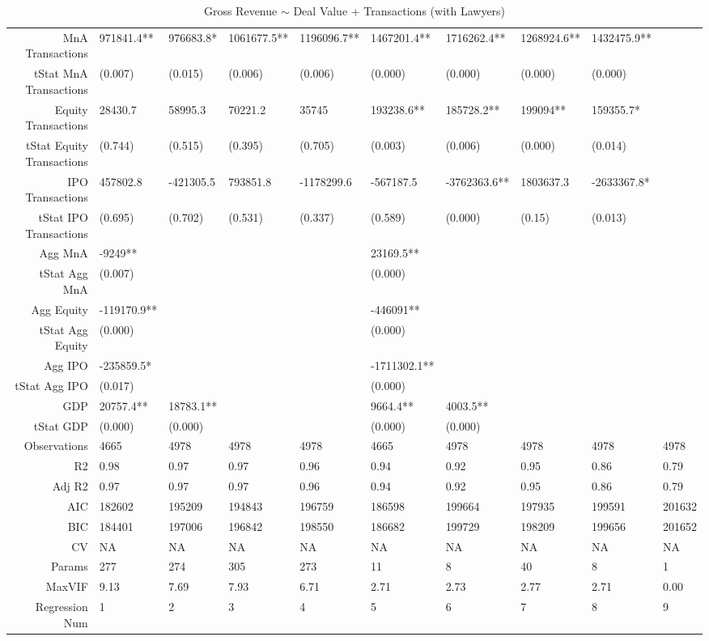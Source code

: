 \begin{table}[ht]
\begin{tabular}{rlllllllll}
  MnA Transactions & 971841.4** & 976683.8* & 1061677.5** & 1196096.7** & 1467201.4** & 1716262.4** & 1268924.6** & 1432475.9** &  \\ 
  tStat MnA Transactions & (0.007) & (0.015) & (0.006) & (0.006) & (0.000) & (0.000) & (0.000) & (0.000) &  \\ 
  Equity Transactions & 28430.7 & 58995.3 & 70221.2 & 35745 & 193238.6** & 185728.2** & 199094** & 159355.7* &  \\ 
  tStat Equity Transactions & (0.744) & (0.515) & (0.395) & (0.705) & (0.003) & (0.006) & (0.000) & (0.014) &  \\ 
  IPO Transactions & 457802.8 & -421305.5 & 793851.8 & -1178299.6 & -567187.5 & -3762363.6** & 1803637.3 & -2633367.8* &  \\ 
  tStat IPO Transactions & (0.695) & (0.702) & (0.531) & (0.337) & (0.589) & (0.000) & (0.15) & (0.013) &  \\ 
  Agg MnA & -9249** &  &  &  & 23169.5** &  &  &  &  \\ 
  tStat Agg MnA & (0.007) &  &  &  & (0.000) &  &  &  &  \\ 
  Agg Equity & -119170.9** &  &  &  & -446091** &  &  &  &  \\ 
  tStat Agg Equity & (0.000) &  &  &  & (0.000) &  &  &  &  \\ 
  Agg IPO & -235859.5* &  &  &  & -1711302.1** &  &  &  &  \\ 
  tStat Agg IPO & (0.017) &  &  &  & (0.000) &  &  &  &  \\ 
  GDP & 20757.4** & 18783.1** &  &  & 9664.4** & 4003.5** &  &  &  \\ 
  tStat GDP & (0.000) & (0.000) &  &  & (0.000) & (0.000) &  &  &  \\ 
  Observations & 4665 & 4978 & 4978 & 4978 & 4665 & 4978 & 4978 & 4978 & 4978 \\ 
  R2 & 0.98 & 0.97 & 0.97 & 0.96 & 0.94 & 0.92 & 0.95 & 0.86 & 0.79 \\ 
  Adj R2 & 0.97 & 0.97 & 0.97 & 0.96 & 0.94 & 0.92 & 0.95 & 0.86 & 0.79 \\ 
  AIC & 182602 & 195209 & 194843 & 196759 & 186598 & 199664 & 197935 & 199591 & 201632 \\ 
  BIC & 184401 & 197006 & 196842 & 198550 & 186682 & 199729 & 198209 & 199656 & 201652 \\ 
  CV & NA & NA & NA & NA & NA & NA & NA & NA & NA \\ 
  Params & 277 & 274 & 305 & 273 & 11 & 8 & 40 & 8 & 1 \\ 
  MaxVIF & 9.13 & 7.69 & 7.93 & 6.71 & 2.71 & 2.73 & 2.77 & 2.71 & 0.00 \\ 
  Regression Num & 1 & 2 & 3 & 4 & 5 & 6 & 7 & 8 & 9 \\ 
   \hline
\end{tabular}
\caption{Gross Revenue $\sim$ Deal Value + Transactions (with Lawyers)} 
\end{table}
